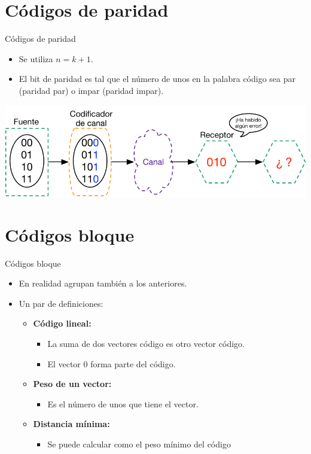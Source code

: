 \documentclass[10pt,compress]{beamer} %
\begin{document}
\section{Códigos de paridad}
\begin{frame}{Códigos de paridad}
  \begin{itemize}
    \item Se utiliza $n = k+1$.
    \item El bit de paridad es tal que el número de unos en la palabra código sea par (paridad par) o impar (paridad impar).
  \end{itemize}
  \centering \includegraphics[width=0.8\linewidth]{Figuras/CodificacionDeparidad.pdf}
\end{frame}


\section{Códigos bloque}
\begin{frame}{Códigos bloque}
  \begin{itemize}
    \item En realidad agrupan también a los anteriores.
    \item Un par de definiciones:
    \begin{itemize}
      \item {\bf Código lineal:}
      \begin{itemize}
        \item La suma de dos vectores código es otro vector código.
        \item El vector $0$ forma parte del código.
      \end{itemize}
      \item {\bf Peso de un vector:}
      \begin{itemize}
        \item Es el número de unos que tiene el vector.
      \end{itemize}
      \item {\bf Distancia mínima:}
      \begin{itemize}
        \item Se puede calcular como el peso mínimo del código
      \end{itemize}
    \end{itemize}
  \end{itemize}
\end{frame}
\end{document}

